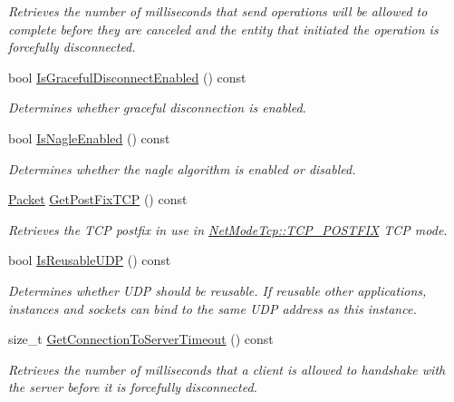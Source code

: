 \begin{DoxyCompactItemize}
\begin{DoxyCompactList}\small\item\em Retrieves the number of milliseconds that send operations will be allowed to complete before they are canceled and the entity that initiated the operation is forcefully disconnected. \item\end{DoxyCompactList}\item 
bool \hyperlink{class_net_instance_profile_aafc19d5c04af571aa711ad5f306e2686}{IsGracefulDisconnectEnabled} () const 
\begin{DoxyCompactList}\small\item\em Determines whether graceful disconnection is enabled. \item\end{DoxyCompactList}\item 
bool \hyperlink{class_net_instance_profile_acb8b8c3655ce8abbd79867130222bd20}{IsNagleEnabled} () const 
\begin{DoxyCompactList}\small\item\em Determines whether the nagle algorithm is enabled or disabled. \item\end{DoxyCompactList}\item 
\hyperlink{class_packet}{Packet} \hyperlink{class_net_instance_profile_a1b41a8d54a6fe70d9ac3cf0dbe20ef3a}{GetPostFixTCP} () const 
\begin{DoxyCompactList}\small\item\em Retrieves the TCP postfix in use in \hyperlink{class_net_mode_a43cfa55ee6a4db66a8d7d6c27f766964abe08876125a416186e74c901f6d29ce4}{NetModeTcp::TCP\_\-POSTFIX} TCP mode. \item\end{DoxyCompactList}\item 
bool \hyperlink{class_net_instance_profile_a57b4bca1eac3896118011edecd961ee1}{IsReusableUDP} () const 
\begin{DoxyCompactList}\small\item\em Determines whether UDP should be reusable. If reusable other applications, instances and sockets can bind to the same UDP address as this instance. \item\end{DoxyCompactList}\item 
size\_\-t \hyperlink{class_net_instance_profile_ab2f53e23e75a13104855efb4f8b4c063}{GetConnectionToServerTimeout} () const 
\begin{DoxyCompactList}\small\item\em Retrieves the number of milliseconds that a client is allowed to handshake with the server before it is forcefully disconnected. \item\end{DoxyCompactList}\item 

\end{DoxyCompactItemize}
